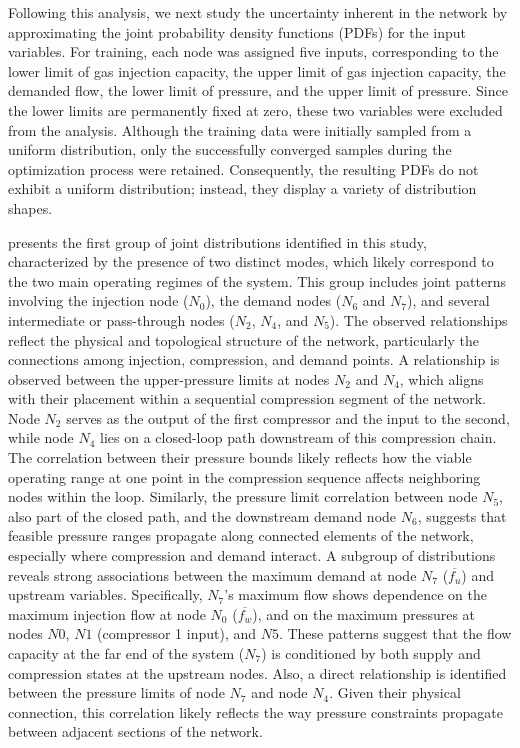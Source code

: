 Following this analysis, we next study the uncertainty inherent in the network by approximating the joint probability density functions (PDFs) for the input variables. For training, each node was assigned five inputs, corresponding to the lower limit of gas injection capacity, the upper limit of gas injection capacity, the demanded flow, the lower limit of pressure, and the upper limit of pressure. Since the lower limits are permanently fixed at zero, these two variables were excluded from the analysis. Although the training data were initially sampled from a uniform distribution, only the successfully converged samples during the optimization process were retained. Consequently, the resulting PDFs do not exhibit a uniform distribution; instead, they display a variety of distribution shapes.


 presents the first group of joint distributions identified in this study, characterized by the presence of two distinct modes, which likely correspond to the two main operating regimes of the system. This group includes joint patterns involving the injection node ($N_0$), the demand nodes ($N_6$ and $N_7$), and several intermediate or pass-through nodes ($N_2$, $N_4$, and $N_5$). The observed relationships reflect the physical and topological structure of the network, particularly the connections among injection, compression, and demand points. A relationship is observed between the upper-pressure limits at nodes \( N_2 \) and \( N_4 \), which aligns with their placement within a sequential compression segment of the network. Node \( N_2 \) serves as the output of the first compressor and the input to the second, while node \( N_4 \) lies on a closed-loop path downstream of this compression chain. The correlation between their pressure bounds likely reflects how the viable operating range at one point in the compression sequence affects neighboring nodes within the loop. Similarly, the pressure limit correlation between node \( N_5 \), also part of the closed path, and the downstream demand node \( N_6 \), suggests that feasible pressure ranges propagate along connected elements of the network, especially where compression and demand interact. A subgroup of distributions reveals strong associations between the maximum demand at node $N_7$ ($\overline{f_u}$) and upstream variables. Specifically, $N_7$'s maximum flow shows dependence on the maximum injection flow at node $N_0$ ($\overline{f_w}$), and on the maximum pressures at nodes $N0$, $N1$ (compressor 1 input), and $N5$. These patterns suggest that the flow capacity at the far end of the system ($N_7$) is conditioned by both supply and compression states at the upstream nodes. Also, a direct relationship is identified between the pressure limits of node $N_7$ and node $N_4$. Given their physical connection, this correlation likely reflects the way pressure constraints propagate between adjacent sections of the network.

